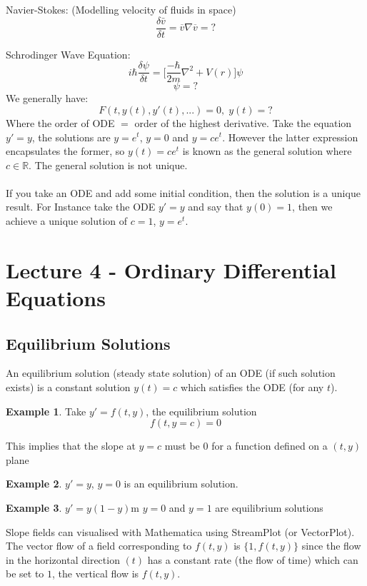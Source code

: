 \documentclass{report}
\theoremstyle{definition}
\newtheorem{example}{Example}
\theoremstyle{plain}
\theoremstyle{remark}
\begin{document}
	Navier-Stokes: (Modelling velocity of fluids in space)
	$$ \frac{\delta \bar{v}}{\delta t} = \overline{v} \nabla \overline{v} = ? $$

	Schrodinger Wave Equation:
	$$ i\hbar \frac{\delta \psi}{\delta t} = \Big[ \frac{-\hbar}{2m} \nabla^2 + V(r)\Big]\psi$$
	$$ \psi = ? $$
	We generally have:
	$$ F(t, y(t), y'(t), ...) = 0,\; y(t) = ? $$
	Where the order of ODE $ = $ order of the highest derivative. Take the
	equation $y' = y$, the solutions are $ y = e^t $, $ y = 0 $ and
	$ y = ce^t $. However the latter expression encapsulates the former, so
	$ y(t) = ce^t $ is known as the general solution where $ c \in
	\mathbb{R} $. The general solution is not unique. \\\\
	If you take an ODE and add some initial condition, then the solution is a unique result. For Instance take the ODE $ y' = y $ and say that $ y(0) = 1 $, then we achieve a unique solution of $ c = 1 $, $ y = e^t $.
      \section{Lecture 4 - Ordinary Differential Equations}
      \subsection{Equilibrium Solutions}
      An equilibrium solution (steady state solution) of an ODE (if such
      solution exists) is a constant solution $ y(t) = c $ which satisfies the
      ODE (for any $ t $). 
      \begin{example}
	Take $ y' = f(t,y) $, the equilibrium solution 
	$$ f(t,y = c) = 0 $$
      \end{example}
      \noindent This implies that the slope at $ y = c $ must be 0 for
      a function defined on a $ (t,y) $ plane

      \begin{example}
      $ y' = y $, $ y = 0 $ is an equilibrium solution.
      \end{example}

      \begin{example}
	$ y' = y(1-y) $m $ y = 0 $ and $ y = 1 $ are equilibrium solutions
      \end{example}
      \noindent Slope fields can visualised with Mathematica using StreamPlot
      (or VectorPlot). The vector flow of a field corresponding to $ f(t,y)
      $ is $ \{1, f(t,y)\} $ since the flow in the horizontal direction $ (t)
      $ has a constant rate (the flow of time) which can be set to $ 1 $, the
      vertical flow is $ f(t,y) $.
\end{document}
